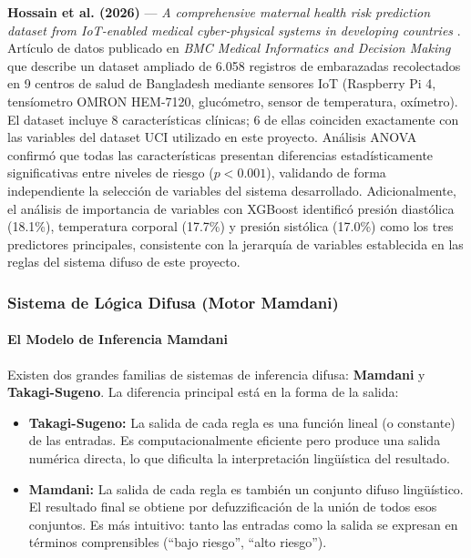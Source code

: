 \documentclass[11pt]{article}
\begin{document}
\textbf{Hossain et al. (2026)} --- \textit{A comprehensive maternal health risk prediction dataset from IoT-enabled medical cyber-physical systems in developing countries} \cite{hossain2026}. Art\'iculo de datos publicado en \textit{BMC Medical Informatics and Decision Making} que describe un dataset ampliado de 6.058 registros de embarazadas recolectados en 9 centros de salud de Bangladesh mediante sensores IoT (Raspberry Pi 4, tens\'iometro OMRON HEM-7120, gluc\'ometro, sensor de temperatura, ox\'imetro). El dataset incluye 8 caracter\'isticas cl\'inicas; 6 de ellas coinciden exactamente con las variables del dataset UCI utilizado en este proyecto. An\'alisis ANOVA confirm\'o que todas las caracter\'isticas presentan diferencias estad\'isticamente significativas entre niveles de riesgo ($p < 0.001$), validando de forma independiente la selecci\'on de variables del sistema desarrollado. Adicionalmente, el an\'alisis de importancia de variables con XGBoost identific\'o presi\'on diast\'olica (18.1\%), temperatura corporal (17.7\%) y presi\'on sist\'olica (17.0\%) como los tres predictores principales, consistente con la jerarqu\'ia de variables establecida en las reglas del sistema difuso de este proyecto.


\subsubsection{Sistema de Lógica Difusa (Motor Mamdani)}

\paragraph{El Modelo de Inferencia Mamdani}

Existen dos grandes familias de sistemas de inferencia difusa: \textbf{Mamdani} y \textbf{Takagi-Sugeno}. La diferencia principal est\'a en la forma de la salida:

\begin{itemize}
    \item \textbf{Takagi-Sugeno:} La salida de cada regla es una funci\'on lineal (o constante) de las entradas. Es computacionalmente eficiente pero produce una salida num\'erica directa, lo que dificulta la interpretaci\'on ling\"u\'istica del resultado.
    \item \textbf{Mamdani:} La salida de cada regla es tambi\'en un conjunto difuso ling\"u\'istico. El resultado final se obtiene por defuzzificaci\'on de la uni\'on de todos esos conjuntos. Es m\'as intuitivo: tanto las entradas como la salida se expresan en t\'erminos comprensibles (``bajo riesgo'', ``alto riesgo'').
\end{itemize}
\end{document}
